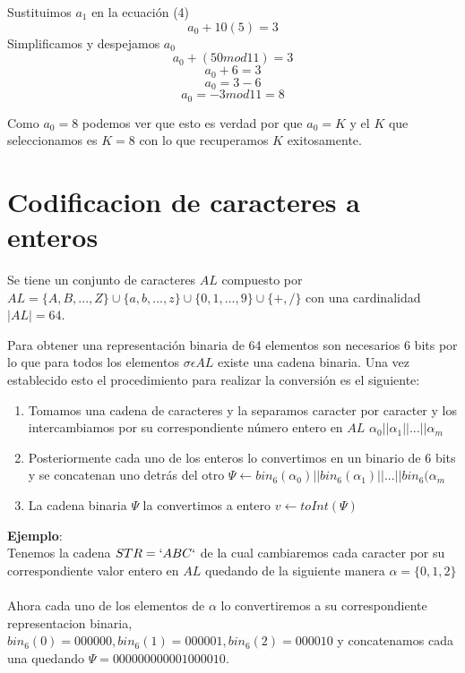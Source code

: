 \documentclass[12pt,oneside,onecolumn,openany]{report}
\begin{document}
Sustituimos $a_1$ en la ecuación (4) 
\begin{equation}
 a_0+10(5)=3
\end{equation}
Simplificamos y despejamos $a_0$
\begin{equation}
 a_0+(50mod11)=3
\end{equation}
\begin{equation}
 a_0+6=3
\end{equation}
\begin{equation}
 a_0=3-6
\end{equation}
\begin{equation}
 a_0=-3mod11=8
\end{equation}

Como $a_0=8$ podemos ver que esto es verdad por que $a_0=K$ y el $K$ que seleccionamos es $K=8$ con lo que recuperamos $K$ exitosamente.


\section{Codificacion de caracteres a enteros}
Se tiene un conjunto de caracteres $AL$ compuesto por $AL=\{A,B,...,Z\}\cup\{a,b,...,z\}\cup\{0,1,...,9\}\cup\{+,/\}$ con una cardinalidad $|AL|=64$.

Para obtener una representación binaria de 64 elementos son necesarios 6 bits por lo que para todos los elementos $\sigma\epsilon AL$ existe una cadena binaria. Una vez establecido esto el procedimiento para realizar la conversión es el siguiente:
\begin{enumerate}
 \item Tomamos una cadena de caracteres y la separamos caracter por caracter y los intercambiamos por su correspondiente número entero en $AL$ $\alpha _0||\alpha _1||...||\alpha _m$
 \item Posteriormente cada uno de los enteros lo convertimos en un binario de 6 bits y se concatenan uno detrás del otro $\Psi\longleftarrow bin_6(\alpha _0)||bin_6(\alpha _1)||...||bin_6(\alpha _m$
 \item La cadena binaria $\Psi$ la convertimos a entero $v\longleftarrow toInt(\Psi)$
\end{enumerate}
\textbf{Ejemplo}:\\
Tenemos la cadena $STR=`ABC`$ de la cual cambiaremos cada caracter por su correspondiente valor entero en $AL$ quedando de la siguiente manera $\alpha =\{0,1,2\}$
\\ 
\\
Ahora cada  uno de los elementos de $\alpha$ lo convertiremos a su correspondiente representacion binaria, $bin_6(0)=000000, bin_6(1)=000001, bin_6(2)=000010$ y concatenamos cada una quedando $\Psi = 000000000001000010$. 
\end{document}
